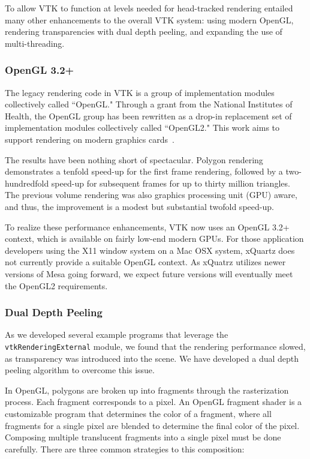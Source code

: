 To allow VTK to function at levels needed for head-tracked rendering entailed
many other enhancements to the overall VTK system:
using modern OpenGL,
rendering transparencies with dual depth peeling, and
expanding the use of multi-threading.

\subsubsection{OpenGL 3.2+}

The legacy rendering code in VTK is a group of implementation modules collectively called ``OpenGL."
Through a grant from the National Institutes of Health, the OpenGL group has
been rewritten as a drop-in replacement set of implementation modules
collectively called ``OpenGL2."
This work aims to support rendering on modern graphics cards~\cite{Hanwell:2015}.

The results have been nothing short of spectacular.
Polygon rendering demonstrates a tenfold speed-up for the first frame rendering, followed by a two-hundredfold speed-up for subsequent frames for up to thirty million triangles.
The previous volume rendering was also graphics processing unit (GPU) aware, and thus, the improvement is a modest but substantial twofold speed-up. 

To realize these performance enhancements, VTK now uses an OpenGL 3.2+ context, which is available on fairly low-end modern GPUs.
For those application developers using the X11 window system on a Mac OSX system, xQuartz does not currently provide a suitable OpenGL context.
As xQuatrz utilizes newer versions of Mesa going forward, we expect future versions will eventually meet the OpenGL2 requirements.

\subsubsection{Dual Depth Peeling}

As we developed several example programs that leverage the \texttt{vtkRenderingExternal} module, we found that the rendering performance slowed, as transparency was introduced into the scene. We have developed a dual depth peeling algorithm to overcome this issue.

In OpenGL, polygons are broken up into fragments through the rasterization process.
Each fragment corresponds to a pixel.
An OpenGL fragment shader is a customizable program that determines the color of a fragment, where all fragments for a single pixel are blended to determine the final color of the pixel.
Composing multiple translucent fragments into a single pixel must be done carefully.
There are three common strategies to this composition:

